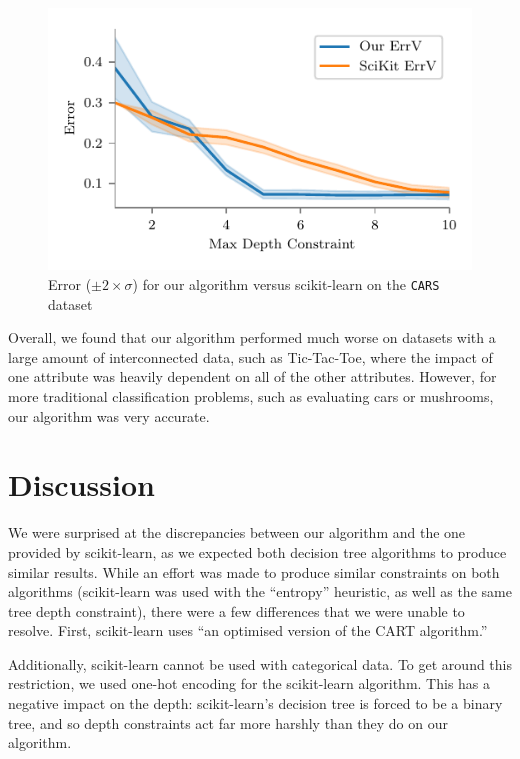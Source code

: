 \documentclass[screen, authorversion, nonacm, sigconf]{acmart}
\begin{document}
\begin{figure}
  \centering
  \includegraphics[width=\columnwidth]{figures/chart_ours_v_scikit_variance_car.pdf}
  \caption{Error ($\pm 2 \times \sigma$) for our algorithm versus scikit-learn on the \texttt{CARS} dataset}
  \label{fig:caroursvscikit}
\end{figure}

Overall, we found that our algorithm performed much worse on datasets with a large amount of interconnected data, such as Tic-Tac-Toe, where the impact of one attribute was heavily dependent on all of the other attributes. However, for more traditional classification problems, such as evaluating cars or mushrooms, our algorithm was very accurate.

\section{Discussion}

We were surprised at the discrepancies between our algorithm and the one provided by scikit-learn, as we expected both decision tree algorithms to produce similar results. While an effort was made to produce similar constraints on both algorithms (scikit-learn was used with the ``entropy'' heuristic, as well as the same tree depth constraint), there were a few differences that we were unable to resolve. First, scikit-learn uses ``an optimised version of the CART \cite{DBLP:books/wa/BreimanFOS84} algorithm.''

Additionally, scikit-learn cannot be used with categorical data. To get around this restriction, we used one-hot encoding for the scikit-learn algorithm. This has a negative impact on the depth: scikit-learn's decision tree is forced to be a binary tree, and so depth constraints act far more harshly than they do on our algorithm.
\end{document}
